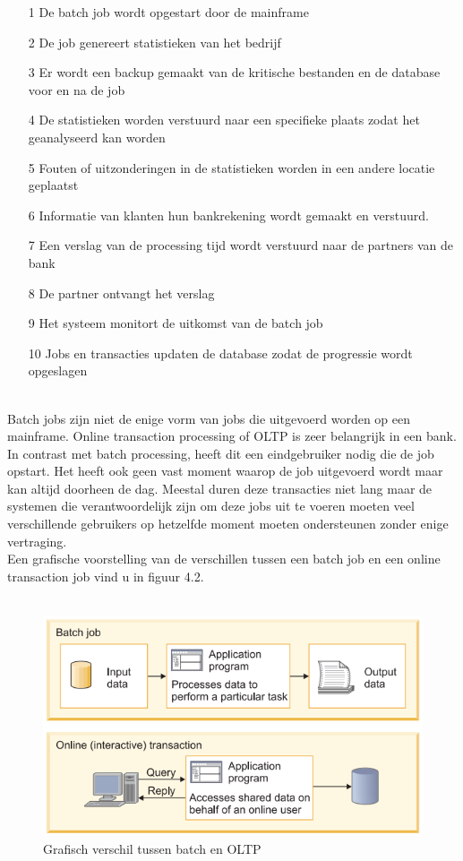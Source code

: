 \begin{itemize}
    \item[1] De batch job wordt opgestart door de mainframe
    \item[2] De job genereert statistieken van het bedrijf
    \item[3] Er wordt een backup gemaakt van de kritische bestanden en de database voor en na de job
    \item[4] De statistieken worden verstuurd naar een specifieke plaats zodat het geanalyseerd kan worden
    \item[5] Fouten of uitzonderingen in de statistieken worden in een andere locatie geplaatst
    \item[6] Informatie van klanten hun bankrekening wordt gemaakt en verstuurd.
    \item[7] Een verslag van de processing tijd wordt verstuurd naar de partners van de bank
    \item[8] De partner ontvangt het verslag
    \item[9] Het systeem monitort de uitkomst van de batch job
    \item[10] Jobs en transacties updaten de database zodat de progressie wordt opgeslagen
\end{itemize}
\\

Batch jobs zijn niet de enige vorm van jobs die uitgevoerd worden op een mainframe. Online transaction processing of OLTP is zeer belangrijk in een bank. In contrast met batch processing, heeft dit een eindgebruiker nodig die de job opstart. Het heeft ook geen vast moment waarop de job uitgevoerd wordt maar kan altijd doorheen de dag. Meestal duren deze transacties niet lang maar de systemen die verantwoordelijk zijn om deze jobs uit te voeren moeten veel verschillende gebruikers op hetzelfde moment moeten ondersteunen zonder enige vertraging. \autocite{IBMb} \\
Een grafische voorstelling van de verschillen tussen een batch job en een online transaction job vind u in figuur 4.2. \\ \\


\begin{figure}[pt!]
    \centering
    \includegraphics[width=400pt]{./graphics/BatchVSOnline.png}
    \caption{Grafisch verschil tussen batch en OLTP \autocite{IBMb}}
    \label{fig}
\end{figure}